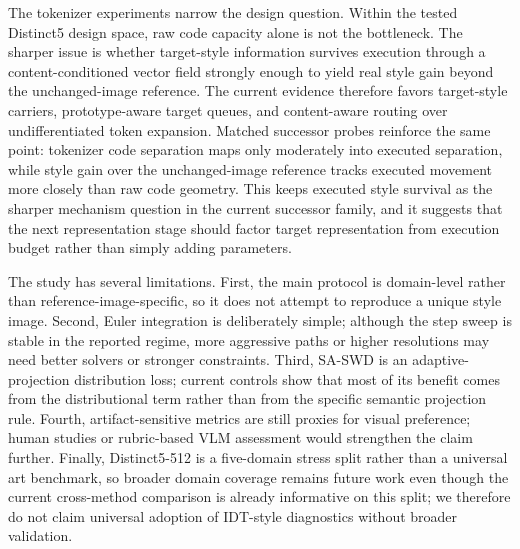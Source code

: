 \documentclass[letterpaper]{article}
\begin{document}
The tokenizer experiments narrow the design question. Within the tested Distinct5 design space, raw code capacity alone is not the bottleneck. The sharper issue is whether target-style information survives execution through a content-conditioned vector field strongly enough to yield real style gain beyond the unchanged-image reference. The current evidence therefore favors target-style carriers, prototype-aware target queues, and content-aware routing over undifferentiated token expansion. Matched successor probes reinforce the same point: tokenizer code separation maps only moderately into executed separation, while style gain over the unchanged-image reference tracks executed movement more closely than raw code geometry. This keeps executed style survival as the sharper mechanism question in the current successor family, and it suggests that the next representation stage should factor target representation from execution budget rather than simply adding parameters.

The study has several limitations. First, the main protocol is domain-level rather than reference-image-specific, so it does not attempt to reproduce a unique style image. Second, Euler integration is deliberately simple; although the step sweep is stable in the reported regime, more aggressive paths or higher resolutions may need better solvers or stronger constraints. Third, SA-SWD is an adaptive-projection distribution loss; current controls show that most of its benefit comes from the distributional term rather than from the specific semantic projection rule. Fourth, artifact-sensitive metrics are still proxies for visual preference; human studies or rubric-based VLM assessment would strengthen the claim further. Finally, Distinct5-512 is a five-domain stress split rather than a universal art benchmark, so broader domain coverage remains future work even though the current cross-method comparison is already informative on this split; we therefore do not claim universal adoption of IDT-style diagnostics without broader validation.
\end{document}
